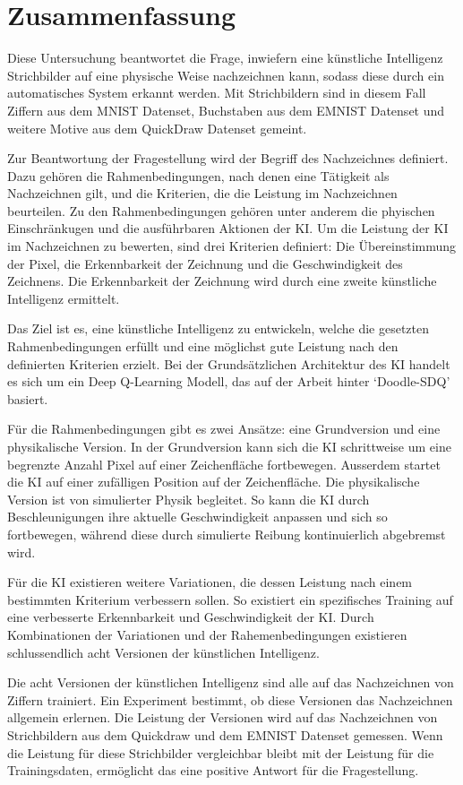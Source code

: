 \chapter{Zusammenfassung}\label{zusammenfassung}
Diese Untersuchung beantwortet die Frage, inwiefern eine künstliche Intelligenz
Strichbilder auf eine physische Weise nachzeichnen kann, sodass diese durch ein
automatisches System erkannt werden. Mit Strichbildern sind in diesem
Fall Ziffern aus dem MNIST Datenset, Buchstaben aus dem EMNIST Datenset und
weitere Motive aus dem QuickDraw Datenset gemeint. 

Zur Beantwortung der Fragestellung wird der Begriff des Nachzeichnes definiert.
Dazu gehören die Rahmenbedingungen, nach denen eine Tätigkeit als Nachzeichnen
gilt, und die Kriterien, die die Leistung im Nachzeichnen beurteilen. Zu den
Rahmenbedingungen gehören unter anderem die phyischen Einschränkugen und die
ausführbaren Aktionen der KI. Um die Leistung der KI im Nachzeichnen zu
bewerten, sind drei Kriterien definiert: Die Übereinstimmung der Pixel, die
Erkennbarkeit der Zeichnung und die Geschwindigkeit des Zeichnens. Die
Erkennbarkeit der Zeichnung wird durch eine zweite künstliche Intelligenz
ermittelt.

Das Ziel ist es, eine künstliche Intelligenz zu entwickeln, welche die gesetzten
Rahmenbedingungen erfüllt und eine möglichst gute Leistung nach den definierten
Kriterien erzielt. Bei der Grundsätzlichen Architektur des KI handelt es sich um
ein Deep Q-Learning Modell, das auf der Arbeit hinter `Doodle-SDQ'
basiert.

Für die Rahmenbedingungen gibt es zwei Ansätze: eine Grundversion und eine
physikalische Version. In der Grundversion kann sich die KI schrittweise um eine
begrenzte Anzahl Pixel auf einer Zeichenfläche fortbewegen. Ausserdem startet
die KI auf einer zufälligen Position auf der Zeichenfläche. Die physikalische
Version ist von simulierter Physik begleitet. So kann die KI durch
Beschleunigungen ihre aktuelle Geschwindigkeit anpassen und sich so fortbewegen,
während diese durch simulierte Reibung kontinuierlich abgebremst wird. 

Für die KI existieren weitere Variationen, die dessen Leistung nach einem
bestimmten Kriterium verbessern sollen. So existiert ein spezifisches Training
auf eine verbesserte Erkennbarkeit und Geschwindigkeit der KI. Durch
Kombinationen der Variationen und der Rahemenbedingungen existieren
schlussendlich acht Versionen der künstlichen Intelligenz.

Die acht Versionen der künstlichen Intelligenz sind alle auf das Nachzeichnen
von Ziffern trainiert. Ein Experiment bestimmt, ob diese Versionen das
Nachzeichnen allgemein erlernen. Die Leistung der Versionen wird auf das
Nachzeichnen von Strichbildern aus dem Quickdraw und dem EMNIST Datenset
gemessen. Wenn die Leistung für diese Strichbilder vergleichbar bleibt mit der
Leistung für die Trainingsdaten, ermöglicht das eine positive Antwort für
die Fragestellung.

